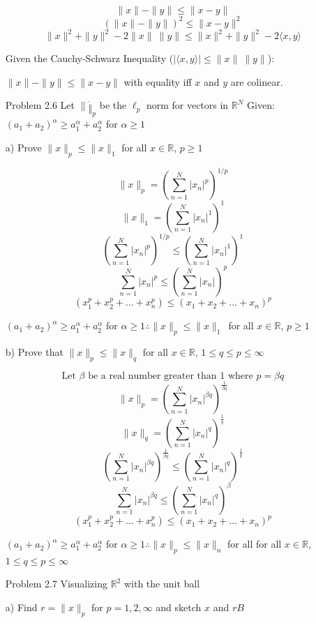 \documentclass[12pt]{article}
\begin{document}
\begin{enumerate}
\[\|x\|-\|y\|\le \|x-y\|\]
\[(\|x\|-\|y\|)^2\le \|x-y\|^2\]
\[\|x\|^2+\|y\|^2-2\|x\|\:\|y\|\le \|x\|^2+\|y\|^2-2\langle x,y\rangle\]

\begin{framed}
Given the Cauchy-Schwarz Inequality ($|\langle x,y\rangle|\le\|x\|\:\|y\|$): 

$\|x\|-\|y\|\le \|x-y\|$ with equality iff $x$ and $y$ are colinear.
\end{framed}

\newpage

\item[Problem 2.6] Let $\|\dot\|_p$ be the $\ell_p$ norm for vectors in $\mathbb{R}^N$
Given: $(a_1+a_2)^\alpha\ge a_1^\alpha+a_2^\alpha$ for $\alpha\ge1$

a) Prove $\|x\|_p\le\|x\|_1$ for all $x\in\mathbb{R}$, $p\ge 1$

\[\|x\|_p=(\sum_{n=1}^{N}|x_n|^p)^{1/p}\]
\[\|x\|_1=(\sum_{n=1}^{N}|x_n|^1)^1\]
\[(\sum_{n=1}^{N}|x_n|^p)^{1/p}\le(\sum_{n=1}^{N}|x_n|^1)^1\]
\[\sum_{n=1}^{N}|x_n|^p\le(\sum_{n=1}^{N}|x_n|)^p\]
\[(x_1^p+x_2^p+...+x_n^p)\le(x_1+x_2+...+x_n)^p\]

\begin{framed}
$(a_1+a_2)^\alpha\ge a_1^\alpha+a_2^\alpha$ for $\alpha\ge1 \therefore \|x\|_p\le\|x\|_1$\
for all $x\in\mathbb{R}$, $p\ge 1$
\end{framed}

b) Prove that $\|x\|_p\le\|x\|_q$ for all $x\in\mathbb{R}$, $1\le q\le p\le\infty$

\[\text{Let $\beta$ be a real number greater than 1 where $p=\beta q$}\]
\[\|x\|_p=(\sum_{n=1}^{N}|x_n|^{\beta q})^{\frac{1}{\beta q}}\]
\[\|x\|_q=(\sum_{n=1}^{N}|x_n|^q)^\frac{1}{q}\]
\[(\sum_{n=1}^{N}|x_n|^{\beta q})^{\frac{1}{\beta q}}\le(\sum_{n=1}^{N}|x_n|^q)^\frac{1}{q}\]
\[\sum_{n=1}^{N}|x_n|^{\beta q}\le(\sum_{n=1}^{N}|x_n|^q)^\beta\]
\[(x_1^p+x_2^p+...+x_n^p)\le(x_1+x_2+...+x_n)^p\]

\begin{framed}
$(a_1+a_2)^\alpha\ge a_1^\alpha+a_2^\alpha$ for $\alpha\ge1 \therefore \|x\|_p\le\|x\|_n$ 
for all for all $x\in\mathbb{R}$, $1\le q\le p\le\infty$
\end{framed}


\newpage

\item[Problem 2.7] Visualizing $\mathbb{R}^2$ with the unit ball

a) Find $r = \|x\|_p$ for $p=1,2,\infty$ and sketch $x$ and $rB$


\end{enumerate}
\end{document}
